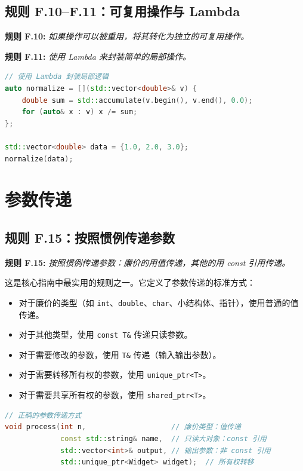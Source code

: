 \subsection{规则 F.10--F.11：可复用操作与 Lambda}

\textbf{规则 F.10:} \textit{如果操作可以被重用，将其转化为独立的可复用操作。}

\textbf{规则 F.11:} \textit{使用 Lambda 来封装简单的局部操作。}

\begin{lstlisting}[language=C++]
// 使用 Lambda 封装局部逻辑
auto normalize = [](std::vector<double>& v) {
    double sum = std::accumulate(v.begin(), v.end(), 0.0);
    for (auto& x : v) x /= sum;
};

std::vector<double> data = {1.0, 2.0, 3.0};
normalize(data);
\end{lstlisting}

\section{参数传递}

\subsection{规则 F.15：按照惯例传递参数}

\textbf{规则 F.15:} \textit{按照惯例传递参数：廉价的用值传递，其他的用 const 引用传递。}

这是核心指南中最实用的规则之一。它定义了参数传递的标准方式：

\begin{itemize}
  \item 对于廉价的类型（如 \texttt{int}、\texttt{double}、\texttt{char}、小结构体、指针），使用普通的值传递。
  \item 对于其他类型，使用 \texttt{const T\&} 传递只读参数。
  \item 对于需要修改的参数，使用 \texttt{T\&} 传递（输入输出参数）。
  \item 对于需要转移所有权的参数，使用 \texttt{unique\_ptr<T>}。
  \item 对于需要共享所有权的参数，使用 \texttt{shared\_ptr<T>}。
\end{itemize}

\begin{lstlisting}[language=C++]
// 正确的参数传递方式
void process(int n,                    // 廉价类型：值传递
             const std::string& name,  // 只读大对象：const 引用
             std::vector<int>& output, // 输出参数：非 const 引用
             std::unique_ptr<Widget> widget);  // 所有权转移
\end{lstlisting}

